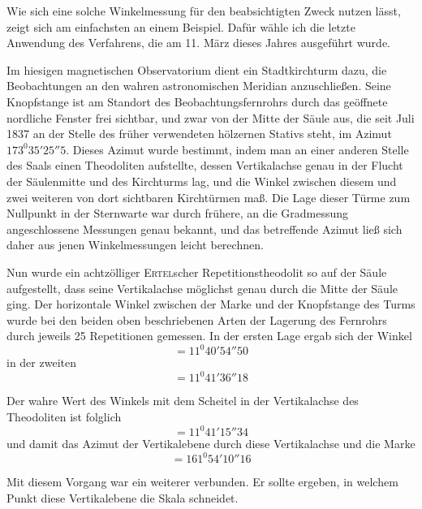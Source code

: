 Wie sich eine solche Winkelmessung für den beabsichtigten Zweck nutzen lässt, zeigt sich am einfachsten an einem Beispiel. Dafür wähle ich die letzte Anwendung des Verfahrens, die am 11. März dieses Jahres ausgeführt wurde.

Im hiesigen magnetischen Observatorium dient ein Stadtkirchturm dazu, die Beobachtungen an den wahren astronomischen Meridian anzuschließen. Seine Knopfstange ist am Standort des Beobachtungsfernrohrs durch das geöffnete nordliche Fenster frei sichtbar, und zwar von der Mitte der Säule aus, die seit Juli 1837 an der Stelle des früher verwendeten hölzernen Stativs steht, im Azimut $173^0 35'25''5$. Dieses Azimut wurde bestimmt, indem man an einer anderen Stelle des Saals einen Theodoliten aufstellte, dessen Vertikalachse genau in der Flucht der Säulenmitte und des Kirchturms lag, und die Winkel zwischen diesem und zwei weiteren von dort sichtbaren Kirchtürmen maß. Die Lage dieser Türme zum Nullpunkt in der Sternwarte war durch frühere, an die Gradmessung angeschlossene Messungen genau bekannt, und das betreffende Azimut ließ sich daher aus jenen Winkelmessungen leicht berechnen.

Nun wurde ein achtzölliger \textsc{Ertel}scher Repetitionstheodolit so auf der Säule aufgestellt, dass seine Vertikalachse möglichst genau durch die Mitte der Säule ging. Der horizontale Winkel zwischen der Marke und der Knopfstange des Turms wurde bei den beiden oben beschriebenen Arten der Lagerung des Fernrohrs durch jeweils 25 Repetitionen gemessen. In der ersten Lage ergab sich der Winkel
\[
=11^0 40'54''50
\]
in der zweiten
\[
=11^0 41'36''18
\]

Der wahre Wert des Winkels mit dem Scheitel in der Vertikalachse des Theodoliten ist folglich
\[
=11^0 41'15''34
\]
und damit das Azimut der Vertikalebene durch diese Vertikalachse und die Marke
\[
=161^0 54'10''16
\]

Mit diesem Vorgang war ein weiterer verbunden. Er sollte ergeben, in welchem Punkt diese Vertikalebene die Skala schneidet.

